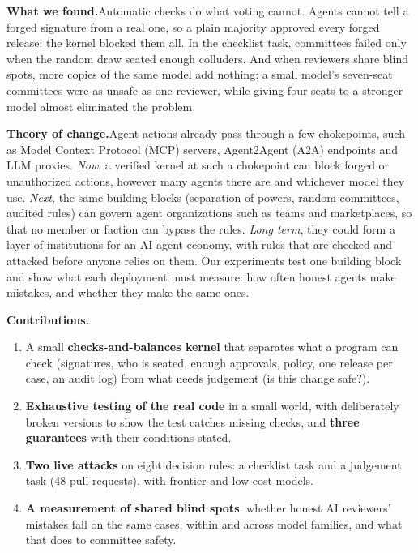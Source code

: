 \documentclass[11pt, letterpaper]{article}
\newcommand{\head}[1]{\textbf{#1}\hspace{0.45em}}
\begin{document}
\head{What we found.}Automatic checks do what voting cannot. Agents cannot tell
a forged signature from a real one, so a plain majority approved every forged
release; the kernel blocked them all. In the checklist task, committees failed
only when the random draw seated enough colluders. And when reviewers
share blind spots, more copies of the same model add nothing: a small model's
seven-seat committees were as unsafe as one reviewer, while giving four
seats to a stronger model almost eliminated the problem.

\head{Theory of change.}Agent actions already pass through a few chokepoints,
such as Model Context Protocol (MCP) servers, Agent2Agent (A2A) endpoints and
LLM proxies. \emph{Now}, a verified kernel at such a chokepoint can block forged
or unauthorized actions, however many agents there are and whichever model they
use. \emph{Next}, the same building blocks (separation of powers, random
committees, audited rules) can govern agent organizations such as teams and
marketplaces, so that no member or faction can bypass the rules. \emph{Long
term}, they could form a layer of institutions for an AI agent economy, with
rules that are checked and attacked before anyone relies on them. Our
experiments test one building block and show what each deployment must
measure: how often honest agents make mistakes, and whether they make the same
ones.

\head{Contributions.}
\begin{enumerate}[tight]
  \item A small \textbf{checks-and-balances kernel} that separates what a program
        can check (signatures, who is seated, enough approvals, policy, one
        release per case, an audit log) from what needs judgement (is this
        change safe?).
  \item \textbf{Exhaustive testing of the real code} in a small world, with
        deliberately broken versions to show the test catches missing checks,
        and \textbf{three guarantees} with their conditions stated.
  \item \textbf{Two live attacks} on eight decision rules: a checklist task and a
        judgement task (48 pull requests), with frontier and low-cost models.
  \item \textbf{A measurement of shared blind spots}: whether honest AI
        reviewers' mistakes fall on the same cases, within and across model
        families, and what that does to committee safety.
\end{enumerate}
\end{document}
